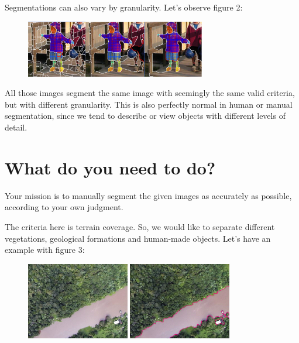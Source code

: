 Segmentations can also vary by granularity. Let's observe figure 2:

\begin{figure}[h!]
  \centering
  \includegraphics[width=0.7\textwidth]{imgs/manualseginstr_fig2}
\end{figure}

\vspace{1in}

All those images segment the same image with seemingly the same valid criteria, but with different granularity. This is also perfectly normal in human or manual segmentation, since we tend to describe or view objects with different levels of detail.

\section*{What do you need to do?}

Your mission is to manually segment the given images as accurately as possible, according to your own judgment.

The criteria here is terrain coverage. So, we would like to separate different vegetations, geological formations and human-made objects. Let's have an example with figure 3:

\begin{figure}[h!]
  \centering
  \includegraphics[width=0.4\textwidth]{imgs/manualseginstr_fig3a}
  \includegraphics[width=0.4\textwidth]{imgs/manualseginstr_fig3b}
\end{figure}



